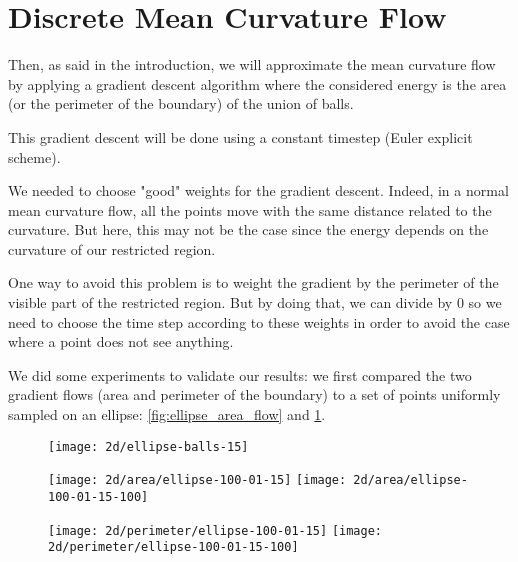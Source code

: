 \section{Discrete Mean Curvature Flow}

Then, as said in the introduction, we will approximate the mean curvature flow
by applying a gradient descent algorithm where the considered energy is the area
(or the perimeter of the boundary) of the union of balls.

This gradient descent will be done using a constant timestep (Euler explicit
scheme).

We needed to choose "good" weights for the gradient descent. Indeed, in a normal
mean curvature flow, all the points move with the same distance related to the
curvature. But here, this may not be the case since the energy depends on the
curvature of our restricted region.

One way to avoid this problem is to weight the gradient by the perimeter of the
visible part of the restricted region. But by doing that, we can divide by $ 0 $
so we need to choose the time step according to these weights in order to avoid
the case where a point does not see anything.


We did some experiments to validate our results: we first compared the two
gradient flows (area and perimeter of the boundary) to a set of points uniformly
sampled on an ellipse: \ref{fig:ellipse_area_flow} and
\ref{fig:ellipse_perimeter_flow}.

\begin{figure}[h]
    \centering

    \texttt{[image: 2d/ellipse-balls-15]}

    \texttt{[image: 2d/area/ellipse-100-01-15]}
    \texttt{[image: 2d/area/ellipse-100-01-15-100]}
    \label{fig:ellipse_area_flow}

    \texttt{[image: 2d/perimeter/ellipse-100-01-15]}
    \texttt{[image: 2d/perimeter/ellipse-100-01-15-100]}
    \label{fig:ellipse_perimeter_flow}
\end{figure}

